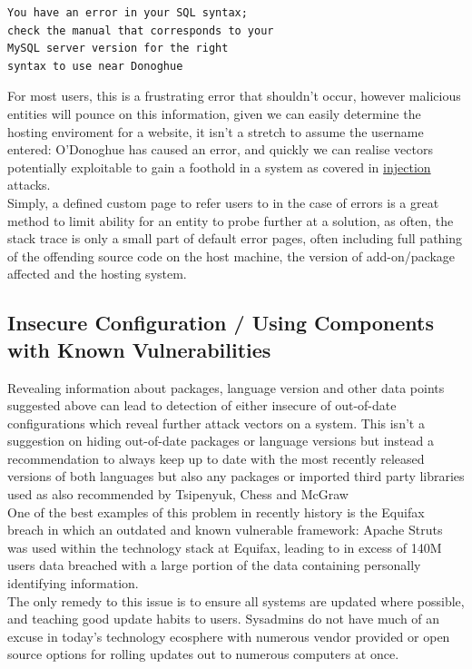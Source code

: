 \documentclass{IEEEtran}
\begin{document}
            \begin{verbatim}
You have an error in your SQL syntax; 
check the manual that corresponds to your 
MySQL server version for the right 
syntax to use near Donoghue
            \end{verbatim}

            For most users, this is a frustrating error that shouldn't occur, however malicious 
            entities will pounce on this information, given we can easily determine the hosting
            enviroment for a website, it isn't a stretch to assume the username entered: O'Donoghue
            has caused an error, and quickly we can realise vectors potentially exploitable to gain
            a foothold in a system as covered in \hyperref[sec:injection]{\color{blue}injection} attacks.
            \medskip
            \\
            Simply, a defined custom page to refer users to in the case of errors is a great method
            to limit ability for an entity to probe further at a solution, as often, the stack trace
            is only a small part of default error pages, often including full pathing of the 
            offending source code on the host machine, the version of add-on/package affected and 
            the hosting system.

        \subsection{Insecure Configuration / Using Components with Known Vulnerabilities}
            Revealing information about packages, language version and other data points suggested above can lead 
            to detection of either insecure of out-of-date configurations 
            which reveal further attack vectors on a system. This isn't a suggestion on hiding 
            out-of-date packages or language versions but instead a recommendation to always keep
            up to date with the most recently released versions of both languages but also any 
            packages or imported third party libraries used as also recommended by Tsipenyuk, 
            Chess and McGraw\cite{tsipenyuk2005seven}
            \medskip
            \\
            One of the best examples of this problem in recently history is the Equifax breach in which an 
            outdated and known vulnerable framework: Apache Struts was used within the technology stack at
            Equifax\cite{Equifax-Breach}, leading to in excess of 140M users data breached with a large portion 
            of the data containing personally identifying information.
            \\
            The only remedy to this issue is to ensure all systems are updated where possible, and teaching good 
            update habits to users. Sysadmins do not have much of an excuse in today's technology ecosphere with 
            numerous vendor provided or open source options for rolling updates out to numerous computers at once.
\end{document}
